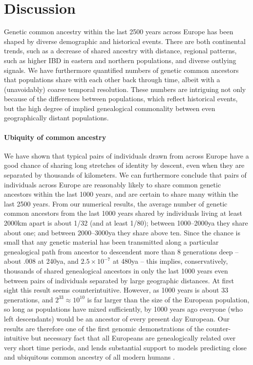 \documentclass{article}
\begin{document}
\section{Discussion}

Genetic common ancestry within the last 2500 years across Europe
has been shaped by diverse demographic and historical events.
There are both continental trends, 
such as a decrease of shared ancestry with distance,
regional patterns,
such as higher IBD in eastern and northern populations,
and diverse outlying signals.
We have furthermore quantified numbers of genetic common ancestors that populations share with each other back through time,
albeit with a (unavoidably) coarse temporal resolution.
These numbers are intriguing not only because of the differences between populations,
which reflect historical events,
but the high degree of implied genealogical commonality between even geographically distant populations.

\paragraph{Ubiquity of common ancestry}
We have shown that typical pairs of individuals drawn from across
Europe have a good chance of sharing long stretches of identity by descent,
even when they are separated by thousands of kilometers. 
We can furthermore conclude that pairs of individuals across Europe 
are reasonably likely to share common genetic ancestors within the last 1000 years,
and are certain to share many within the last 2500 years.
From our numerical results, the average number of genetic common ancestors from the last 1000 years
shared by individuals living at least 2000km apart
is about 1/32 (and at least 1/80);
between 1000--2000ya they share about one;
and between 2000--3000ya they share above ten.
Since the chance is small that any genetic material has been transmitted along a particular
genealogical path from ancestor to descendent more than 8 generations deep
\citep{donnelly1983probability}
-- about .008 at 240ya, and $2.5\times10^{-7}$ at 480ya  -- %
this implies, conservatively, 
thousands of shared genealogical ancestors in only the last 1000 years 
even between pairs of individuals separated by large geographic distances.
At first sight this result seems counterintuitive. 
However, 
as 1000 years is about 33 generations,
and $2^{33} \approx 10^{10}$ is far larger than the size of the European population,
so long as populations have mixed sufficiently,
by 1000 years ago everyone (who left descendants) 
would be an ancestor of every present day European.
Our results are therefore one of the first genomic demonstrations of the counter-intuitive but
necessary fact that all Europeans are genealogically related over very short time periods,
and lends substantial support to models predicting 
close and ubiquitous common ancestry of all modern humans \citep{rohde2004modelling}.
\end{document}
